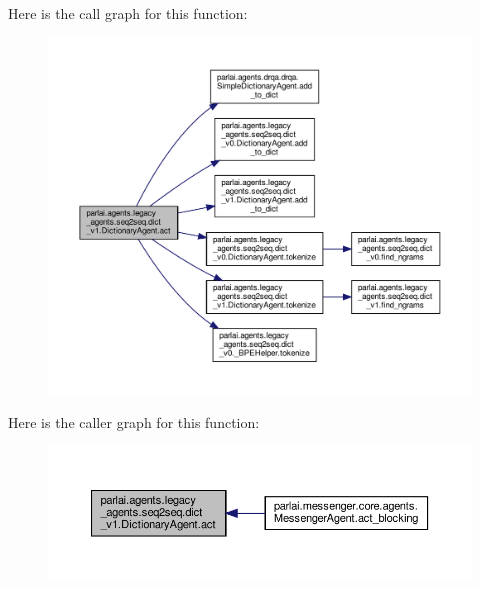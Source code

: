 Here is the call graph for this function\+:
\nopagebreak
\begin{figure}[H]
\begin{center}
\leavevmode
\includegraphics[width=350pt]{classparlai_1_1agents_1_1legacy__agents_1_1seq2seq_1_1dict__v1_1_1DictionaryAgent_a46c77fca1e6062b363ed8ee402d46986_cgraph}
\end{center}
\end{figure}
Here is the caller graph for this function\+:
\nopagebreak
\begin{figure}[H]
\begin{center}
\leavevmode
\includegraphics[width=350pt]{classparlai_1_1agents_1_1legacy__agents_1_1seq2seq_1_1dict__v1_1_1DictionaryAgent_a46c77fca1e6062b363ed8ee402d46986_icgraph}
\end{center}
\end{figure}
\mbox{\label{classparlai_1_1agents_1_1legacy__agents_1_1seq2seq_1_1dict__v1_1_1DictionaryAgent_af61a97dffe00fd1289b0389a6916aa35}} 
